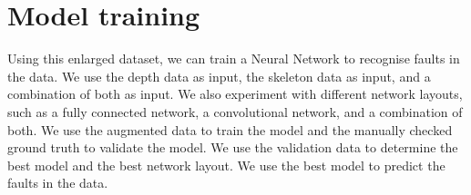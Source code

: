 \section{Model training}
\label{sec:model_training}

Using this enlarged dataset, we can train a Neural Network to recognise faults in the data. We use the depth data as input, the skeleton data as input, and a combination of both as input. We also experiment with different network layouts, such as a fully connected network, a convolutional network, and a combination of both. We use the augmented data to train the model and the manually checked ground truth to validate the model. We use the validation data to determine the best model and the best network layout. We use the best model to predict the faults in the data. 